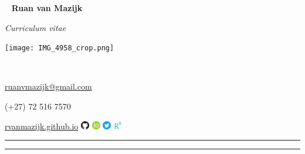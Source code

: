 \begin{multicols}{3}
  \
  \vfill
  \raggedleft
    {\huge \textbf{Ruan van Mazijk}} \par
    {\large \textit{Curriculum vitae}}
  \vfill
  \
  \begin{center}
    \texttt{[image: IMG\_4958\_crop.png]}
  \end{center}
  \columnbreak
  \par \
  \vfill
  \raggedright
    {\large \href{mailto:ruanvmazijk@gmail.com}{ruanvmazijk@gmail.com}} \par
    (+27) 72 516 7570 \par
    \href{https://rvanmazijk.github.io}{rvanmazijk.github.io}
      \href{https://github.com/rvanmazijk}
           {\includegraphics[width=1em]{logos/GitHub.png}}
      \href{https://orcid.org/0000-0003-2659-6909}
           {\includegraphics[width=1em]{logos/ORCID.png}}
      \href{https://twitter.com/rvanmazijk}
           {\includegraphics[width=1em]{logos/Twitter.png}}
      \href{https://www.researchgate.net/profile/Ruan-Van-Mazijk}
           {\includegraphics[width=1em]{logos/ResearchGate-white_crop.jpg}}
  \vfill
  \
\end{multicols}

\hrule \vskip2pt \hrule
